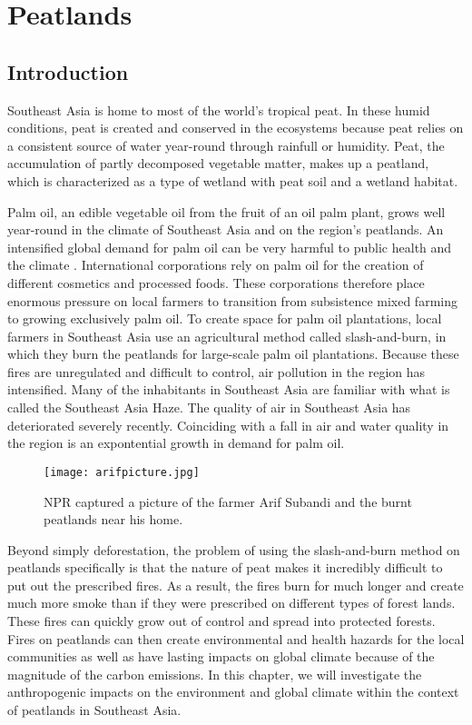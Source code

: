 \chapter{Peatlands}

\section{Introduction}

Southeast Asia is home to most of the world's tropical peat. In these humid conditions, peat is created and conserved in the ecosystems because peat relies on a consistent source of water year-round through rainfull or humidity. Peat, the accumulation of partly decomposed vegetable matter, makes up a peatland, which is characterized as a type of wetland with peat soil and a wetland habitat. 

Palm oil, an edible vegetable oil from the fruit of an oil palm plant, grows well year-round in the climate of Southeast Asia and on the region's peatlands. An intensified global demand for palm oil can be very harmful to public health and the climate \citep{knitr2013}. International corporations rely on palm oil for the creation of different cosmetics and processed foods. These corporations therefore place enormous pressure on local farmers to transition from subsistence mixed farming to growing exclusively palm oil. To create space for palm oil plantations, local farmers in Southeast Asia use an agricultural method called slash-and-burn, in which they burn the peatlands for large-scale palm oil plantations. Because these fires are unregulated and difficult to control, air pollution in the region has intensified. Many of the inhabitants in Southeast Asia are familiar with what is called the Southeast Asia Haze. The quality of air in Southeast Asia has deteriorated severely recently. Coinciding with a fall in air and water quality in the region is an expontential growth in demand for palm oil. 

\begin{figure}
  \texttt{[image: arifpicture.jpg]}
  \caption{NPR captured a picture of the farmer Arif Subandi and the burnt peatlands near his home.}
  \label{fig:arifpicture}
\end{figure}

Beyond simply deforestation, the problem of using the slash-and-burn method on peatlands specifically is that the nature of peat makes it incredibly difficult to put out the prescribed fires. As a result, the fires burn for much longer and create much more smoke than if they were prescribed on different types of forest lands. These fires can quickly grow out of control and spread into protected forests. Fires on peatlands can then create environmental and health hazards for the local communities as well as have lasting impacts on global climate because of the magnitude of the carbon emissions. In this chapter, we will investigate the anthropogenic impacts on the environment and global climate within the context of peatlands in Southeast Asia. 

